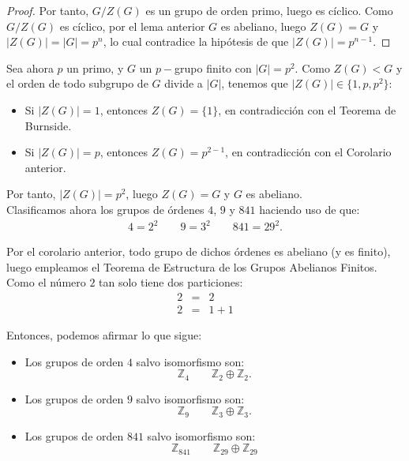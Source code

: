 \begin{ejercicio}
\begin{coro}
\begin{proof}
            Por tanto, \(G/Z(G)\) es un grupo de orden primo, luego es cíclico. Como $G/Z(G)$ es cíclico, por el lema anterior \(G\) es abeliano, luego \(Z(G) = G\) y \(|Z(G)| = |G| = p^n\), lo cual contradice la hipótesis de que \(|Z(G)| = p^{n-1}\).
        \end{proof}
    \end{coro}

    Sea ahora \(p\) un primo, y $G$ un \(p-\)grupo finito con \(|G| = p^2\). Como $Z(G)<G$ y el orden de todo subgrupo de \(G\) divide a \(|G|\), tenemos que \(|Z(G)|\in \{1, p, p^2\}\):
    \begin{itemize}
        \item Si \(|Z(G)| = 1\), entonces \(Z(G) = \{1\}\), en contradicción con el Teorema de Burnside.
        \item Si \(|Z(G)| = p\), entonces \(Z(G)=p^{2-1}\), en contradicción con el Corolario anterior.
    \end{itemize}

    Por tanto, \(|Z(G)| = p^2\), luego \(Z(G) = G\) y \(G\) es abeliano.\\

    Clasificamos ahora los grupos de órdenes \(4\), \(9\) y \(841\) haciendo uso de que:
    \begin{align*}
        4= 2^2 \qquad 9= 3^2 \qquad 841 = 29^2.
    \end{align*}

    Por el corolario anterior, todo grupo de dichos órdenes es abeliano (y es finito), luego empleamos el Teorema de Estructura de los Grupos Abelianos Finitos. Como el número $2$ tan solo tiene dos particiones:
    \begin{equation*}
        \begin{array}{rcl}
            2 &=& 2\\
            2 &=& 1+1
        \end{array}
    \end{equation*}

    Entonces, podemos afirmar lo que sigue:
    \begin{itemize}
        \item Los grupos de orden \(4\) salvo isomorfismo son:
        \begin{equation*}
            \mathbb{Z}_4 \qquad \mathbb{Z}_2\oplus\mathbb{Z}_2.
        \end{equation*}
        \item Los grupos de orden \(9\) salvo isomorfismo son:
        \begin{equation*}
            \mathbb{Z}_9 \qquad \mathbb{Z}_3\oplus\mathbb{Z}_3.
        \end{equation*}
        \item Los grupos de orden \(841\) salvo isomorfismo son:
        \begin{equation*}
            \mathbb{Z}_{841} \qquad \mathbb{Z}_{29}\oplus\mathbb{Z}_{29}
        \end{equation*}
    \end{itemize}
\end{ejercicio}

